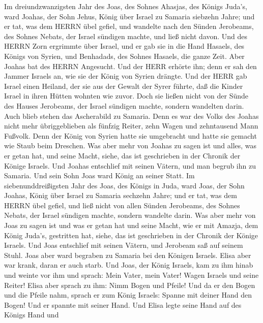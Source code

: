  Im dreiundzwanzigsten Jahr des Joas, des Sohnes Ahasjas,
des Königs Juda's, ward Joahas, der Sohn Jehus, König über Israel zu
Samaria siebzehn Jahre;  und er tat, was dem HERRN übel
gefiel, und wandelte nach den Sünden Jerobeams, des Sohnes Nebats, der
Israel sündigen machte, und ließ nicht davon.  Und des HERRN
Zorn ergrimmte über Israel, und er gab sie in die Hand Hasaels, des
Königs von Syrien, und Benhadads, des Sohnes Hasaels, die ganze Zeit.
 Aber Joahas bat des HERRN Angesucht. Und der HERR erhörte
ihn; denn er sah den Jammer Israels an, wie sie der König von Syrien
drängte.  Und der HERR gab Israel einen Heiland, der sie aus
der Gewalt der Syrer führte, daß die Kinder Israel in ihren Hütten
wohnten wie zuvor.  Doch sie ließen nicht von der Sünde des
Hauses Jerobeams, der Israel sündigen machte, sondern wandelten darin.
Auch blieb stehen das Ascherabild zu Samaria.  Denn es war
des Volks des Joahas nicht mehr übriggeblieben als fünfzig Reiter, zehn
Wagen und zehntausend Mann Fußvolk. Denn der König von Syrien hatte sie
umgebracht und hatte sie gemacht wie Staub beim Dreschen. 
Was aber mehr von Joahas zu sagen ist und alles, was er getan hat, und
seine Macht, siehe, das ist geschrieben in der Chronik der Könige
Israels.  Und Joahas entschlief mit seinen Vätern, und man
begrub ihn zu Samaria. Und sein Sohn Joas ward König an seiner Statt.
 Im siebenunddreißigsten Jahr des Joas, des Königs in Juda,
ward Joas, der Sohn Joahas, König über Israel zu Samaria sechzehn Jahre;
 und er tat, was dem HERRN übel gefiel, und ließ nicht von
allen Sünden Jerobeams, des Sohnes Nebats, der Israel sündigen machte,
sondern wandelte darin.  Was aber mehr von Joas zu sagen
ist und was er getan hat und seine Macht, wie er mit Amazja, dem König
Juda's, gestritten hat, siehe, das ist geschrieben in der Chronik der
Könige Israels.  Und Joas entschlief mit seinen Vätern, und
Jerobeam saß auf seinem Stuhl. Joas aber ward begraben zu Samaria bei
den Königen Israels.  Elisa aber war krank, daran er auch
starb. Und Joas, der König Israels, kam zu ihm hinab und weinte vor ihm
und sprach: Mein Vater, mein Vater! Wagen Israels und seine Reiter!
 Elisa aber sprach zu ihm: Nimm Bogen und Pfeile! Und da er
den Bogen und die Pfeile nahm,  sprach er zum König
Israels: Spanne mit deiner Hand den Bogen! Und er spannte mit seiner
Hand. Und Elisa legte seine Hand auf des Königs Hand  und
